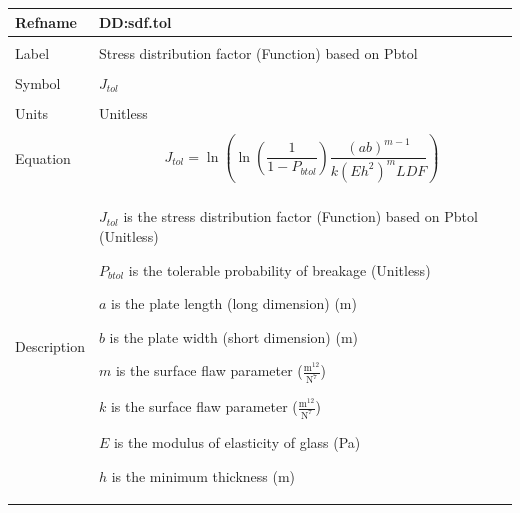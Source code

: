 \documentclass[12pt]{article}
\begin{document}
\noindent \begin{minipage}{\textwidth}
\begin{tabular}{p{} p{}}
\toprule \textbf{Refname} & \textbf{DD:sdf.tol}
\label{DD:sdf.tol}
\\ \midrule \\
Label & Stress distribution factor (Function) based on Pbtol
        \\ \midrule \\
        Symbol & ${J_{tol}}$
                 \\ \midrule \\
                 Units & Unitless
                         \\ \midrule \\
                         Equation & \begin{displaymath}
                                    {J_{tol}}=\ln\left(\ln\left(\frac{1}{1-{P_{btol}}}\right) \frac{\left(a b\right)^{m-1}}{k \left(E h^{2}\right)^{m} LDF}\right)
                                    \end{displaymath}
                                    \\ \midrule \\
                                    Description & \begin{symbDescription}
                                                  \item{${J_{tol}}$ is the stress distribution factor (Function) based on Pbtol (Unitless)}
                                                  \item{${P_{btol}}$ is the tolerable probability of breakage (Unitless)}
                                                  \item{$a$ is the plate length (long dimension) (m)}
                                                  \item{$b$ is the plate width (short dimension) (m)}
                                                  \item{$m$ is the surface flaw parameter ($\frac{\text{m}^{12}}{\text{N}^{7}}$)}
                                                  \item{$k$ is the surface flaw parameter ($\frac{\text{m}^{12}}{\text{N}^{7}}$)}
                                                  \item{$E$ is the modulus of elasticity of glass (Pa)}
                                                  \item{$h$ is the minimum thickness (m)}

\end{symbDescription}
\end{tabular}
\end{minipage}
\end{document}
